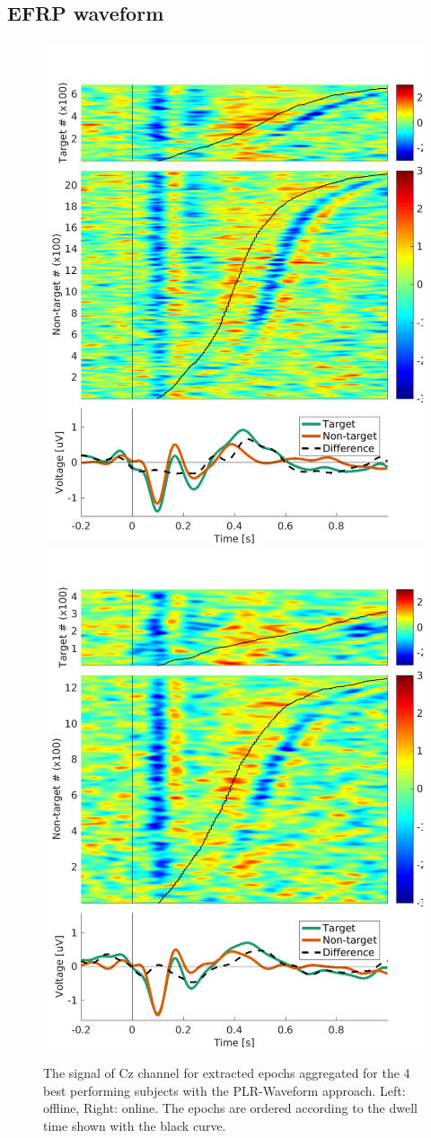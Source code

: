 \documentclass[12pt]{iopart}
\begin{document}
\subsection{EFRP waveform}
\begin{figure}[!t]
    \includegraphics[trim={0cm 0cm 1.5cm 0cm},clip,width=0.45\columnwidth]{../images/offline/Epochs_GA_chCz_Saggregate_objrec_subjects_popuponline_s1.pdf}
    \includegraphics[trim={0cm 0cm 1.5cm 0cm},clip,width=0.45\columnwidth]{../images/online/Epochs_GA_chCz_Saggregate_objrec_subjects_popuponline_s1.pdf}
    \caption{The signal of Cz channel for extracted epochs aggregated
        for the 4 best performing subjects with the PLR-Waveform approach.
        Left: offline, Right: online.
        The epochs are ordered according to the dwell time
        shown with the black curve.
    }
\label{fig:epochsCz}
\end{figure}
\end{document}
